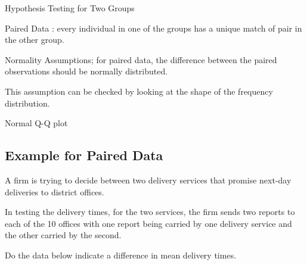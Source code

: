 Hypothesis Testing for Two Groups

Paired Data : every individual in one of the groups has a unique match of pair in the other group.

Normality Assumptions; for paired data, the difference between the paired observations should be normally distributed.

This assumption can be checked by looking at the shape of the frequency distribution.

Normal Q-Q plot



\subsection{Example for Paired Data}

A firm is trying to decide between two delivery services that promise next-day deliveries to district offices.

In testing the delivery times, for the two services, the firm sends two reports to each of the 10 offices with one report being carried by one delivery service and the other carried by the second.

Do the data below indicate a difference in mean delivery times.

